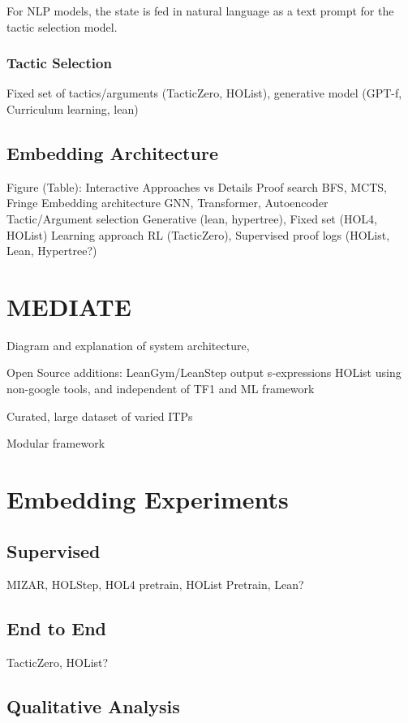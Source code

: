 \documentclass[letterpaper]{article} %
\begin{document}
    For NLP models, the state is fed in natural language as a text prompt for the tactic selection model.

    \subsubsection{Tactic Selection}
    Fixed set of tactics/arguments (TacticZero, HOList), generative model (GPT-f, Curriculum learning, lean)

    \subsection{Embedding Architecture}

    Figure (Table):
    Interactive Approaches vs Details
    Proof search
    BFS, MCTS, Fringe
    Embedding architecture
    GNN, Transformer, Autoencoder
    Tactic/Argument selection
    Generative (lean, hypertree), Fixed set (HOL4, HOList)
    Learning approach
    RL (TacticZero), Supervised proof logs (HOList, Lean, Hypertree?)


    \section{MEDIATE}
    Diagram and explanation of system architecture,

    Open Source additions:
    LeanGym/LeanStep output s-expressions
    HOList using non-google tools, and independent of TF1 and ML framework

    Curated, large dataset of varied ITPs

    Modular framework


    \section{Embedding Experiments}

    \subsection{Supervised}
    MIZAR, HOLStep, HOL4 pretrain, HOList Pretrain, Lean?

    \subsection{End to End}
    TacticZero, HOList?

    \subsection{Qualitative Analysis}
\end{document}
